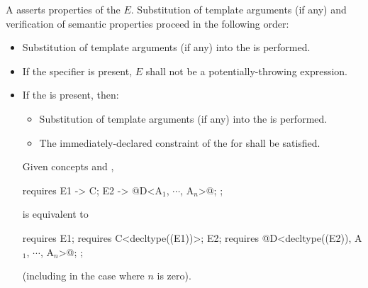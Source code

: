 \pnum
A  asserts properties
of the  $E$. Substitution
of template arguments (if any) and verification of
semantic properties proceed in the following order:

\begin{itemize}
\item
Substitution of template arguments (if any)
into the  is performed.

\item
If the  specifier is present,
$E$ shall not be a potentially-throwing expression.

\item
If the  is present, then:

\begin{itemize}
\item
Substitution of template arguments (if any)
into the  is performed.

\item
The immediately-declared constraint
of the  for 
shall be satisfied.
\end{itemize}
\begin{example}
Given concepts  and ,
\begin{codeblock}
requires {
  { E1 } -> C;
  { E2 } -> @D<A$_1$, $\cdots$, A$_n$>@;
};
\end{codeblock}
is equivalent to
\begin{codeblock}
requires {
  E1; requires C<decltype((E1))>;
  E2; requires @D<decltype((E2)), A$_1$, $\cdots$, A$_n$>@;
};
\end{codeblock}
(including in the case where $n$ is zero).
\end{example}
\end{itemize}
\pnum
